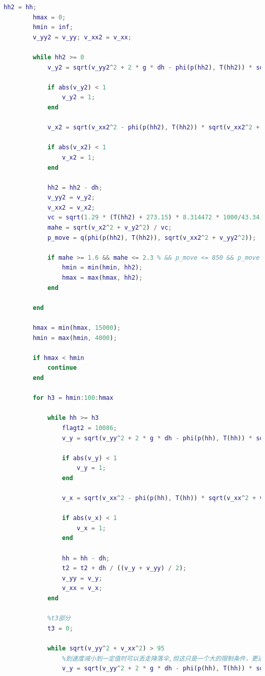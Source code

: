 \documentclass[hyperref,a4paper,UTF8]{ctexart}
\begin{document}
\begin{lstlisting}[language=Matlab]
        hh2 = hh;
        hmax = 0;
        hmin = inf;
        v_yy2 = v_yy; v_xx2 = v_xx;

        while hh2 >= 0
            v_y2 = sqrt(v_yy2^2 + 2 * g * dh - phi(p(hh2), T(hh2)) * sqrt(v_yy2^2 + v_xx2^2) * S_floor * dh * v_yy2 / m);

            if abs(v_y2) < 1
                v_y2 = 1;
            end

            v_x2 = sqrt(v_xx2^2 - phi(p(hh2), T(hh2)) * sqrt(v_xx2^2 + v_yy2^2) * S_floor * dh * v_xx2^2 / (m * v_yy2));

            if abs(v_x2) < 1
                v_x2 = 1;
            end

            hh2 = hh2 - dh;
            v_yy2 = v_y2;
            v_xx2 = v_x2;
            vc = sqrt(1.29 * (T(hh2) + 273.15) * 8.314472 * 1000/43.34);
            mahe = sqrt(v_x2^2 + v_y2^2) / vc;
            p_move = q(phi(p(hh2), T(hh2)), sqrt(v_xx2^2 + v_yy2^2));

            if mahe >= 1.6 && mahe <= 2.3 % && p_move <= 850 && p_move >= 250
                hmin = min(hmin, hh2);
                hmax = max(hmax, hh2);
            end

        end

        hmax = min(hmax, 15000);
        hmin = max(hmin, 4000);

        if hmax < hmin
            continue
        end

        for h3 = hmin:100:hmax

            while hh >= h3
                flagt2 = 10086;
                v_y = sqrt(v_yy^2 + 2 * g * dh - phi(p(hh), T(hh)) * sqrt(v_yy^2 + v_xx^2) * S_floor * dh * v_yy / m);

                if abs(v_y) < 1
                    v_y = 1;
                end

                v_x = sqrt(v_xx^2 - phi(p(hh), T(hh)) * sqrt(v_xx^2 + v_yy^2) * S_floor * dh * v_xx^2 / (m * v_yy));

                if abs(v_x) < 1
                    v_x = 1;
                end

                hh = hh - dh;
                t2 = t2 + dh / ((v_y + v_yy) / 2);
                v_yy = v_y;
                v_xx = v_x;
            end

            %t3部分
            t3 = 0;

            while sqrt(v_yy^2 + v_xx^2) > 95
                %到速度减小到一定值时可以丢走降落伞,但这只是一个大的限制条件，更进一步的条件是马赫数
                v_y = sqrt(v_yy^2 + 2 * g * dh - phi(p(hh), T(hh)) * sqrt(v_yy^2 + v_xx^2) * (S_floor + S_para) * dh * v_yy / m);


\end{lstlisting}
\end{document}
